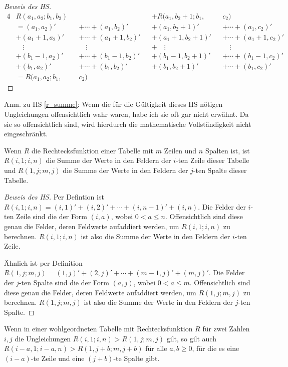 \begin{proof}[Beweis des HS]
\begin{alignat*}{4}
        &R(a_1, a_2; b_1, b_2)&& &&+R(a_1, b_2+1; b_1, &&c_2)\\
        &=(a_1, a_2)' &&+\cdots+ (a_1, b_2)'
        &&+(a_1, b_2+1)'&&+\cdots+(a_1, c_2)'\\
        &+(a_1+1, a_2)'&&+\cdots+ (a_1+1, b_2)'
        &&+(a_1+1, b_2+1)'&&+\cdots+(a_1+1, c_2)'\\
        & \quad\vdots&&\quad\vdots&&+\quad\vdots&&\quad\vdots\\
        &+(b_1-1, a_2)'&&+\cdots + (b_1-1, b_2)'
        &&+(b_1-1, b_2+1)'&&+\cdots+(b_1-1, c_2)'\\
        &+(b_1, a_2)'&&+ \cdots + (b_1, b_2)'
        &&+(b_1, b_2+1)'&&+\cdots+(b_1, c_2)'\\
        &=R(a_1, a_2; b_1, &&c_2)
    \end{alignat*}
\end{proof}
Anm.  zu HS \ref{r_summe}: Wenn die für die Gültigkeit dieses HS nötigen Ungleichungen offensichtlich wahr waren, 
habe ich sie oft gar nicht erwähnt. Da sie so offensichtlich sind, wird hierdurch die mathematische Vollständigkeit 
nicht eingeschränkt.
\begin{lem}\label{r_zeile_spalte}
    Wenn $R$ die Rechtecksfunktion einer Tabelle mit $m$ Zeilen und $n$ Spalten ist, ist $R(i, 1; i, n)$ die Summe 
    der Werte in den Feldern der $i$-ten Zeile dieser Tabelle und $R(1, j; m, j)$ die Summe der Werte in den Feldern 
    der $j$-ten Spalte dieser Tabelle.
\end{lem}
\begin{proof}[Beweis des HS]
    Per Defintion ist $R(i, 1; i, n)=(i, 1)'+(i, 2)'+\cdots+(i, n-1)'+(i, n)$. Die Felder der $i$-ten Zeile sind die 
    der Form $(i, a)$, wobei $0<a\leq n$. Offensichtlich sind diese genau die Felder, deren Feldwerte aufaddiert 
    werden, um $R(i, 1; i, n)$ zu berechnen. $R(i, 1; i, n)$ ist also die Summe der Werte in den Feldern der $i$-ten 
    Zeile.

    Ähnlich ist per Definition $R(1, j; m, j)=(1, j)'+(2, j)'+\cdots+(m-1, j)'+(m, j)'$. Die Felder der $j$-ten Spalte 
    sind die der Form $(a, j)$, wobei $0<a\leq m$. Offensichtlich sind diese genau die Felder, deren Feldwerte 
    aufaddiert werden, um $R(1, j; m, j)$ zu berechnen. $R(1, j; m, j)$ ist also die Summe der Werte in den Feldern 
    der $j$-ten Spalte.
\end{proof}
\begin{lem}\label{mehr_nuller}
    Wenn in einer wohlgeordneten Tabelle mit Rechtecksfunktion $R$ für zwei Zahlen $i, j$ die Ungleichungen 
    $R(i, 1; i, n)>R(1, j; m, j)$ gilt, so gilt auch $R(i-a, 1; i-a, n)>R(1, j+b; m, j+b)$ für alle $a, b\geq0$, für 
    die es eine $(i-a)$-te Zeile und eine $(j+b)$-te Spalte gibt.
\end{lem}
